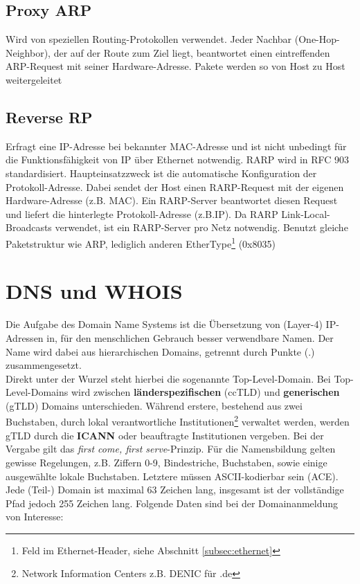 \documentclass{article} %
\begin{document}
\subsection{Proxy ARP}

Wird von speziellen Routing-Protokollen verwendet.
Jeder Nachbar (One-Hop-Neighbor), der auf der Route zum Ziel liegt, beantwortet einen eintreffenden ARP-Request mit seiner Hardware-Adresse.
Pakete werden so von Host zu Host weitergeleitet

\subsection{Reverse RP}

Erfragt eine IP-Adresse bei bekannter MAC-Adresse und ist nicht unbedingt für die Funktionsfähigkeit von IP über Ethernet notwendig.
RARP wird in RFC 903 \cite{rfc903} standardisiert.
Haupteinsatzzweck ist die automatische Konfiguration der Protokoll-Adresse.
Dabei sendet der Host einen RARP-Request mit der eigenen Hardware-Adresse (z.B. MAC).
Ein RARP-Server beantwortet diesen Request und liefert die hinterlegte Protokoll-Adresse (z.B.IP).
Da RARP Link-Local-Broadcasts verwendet, ist ein RARP-Server pro Netz notwendig.
Benutzt gleiche Paketstruktur wie ARP, lediglich anderen EtherType\footnote{Feld im Ethernet-Header, siehe Abschnitt \ref{subsec:ethernet}} (0x8035)

\section{DNS und WHOIS}

Die Aufgabe des Domain Name Systems ist die Übersetzung von (Layer-4) IP-Adressen in, für den menschlichen Gebrauch besser verwendbare Namen.
Der Name wird dabei aus hierarchischen Domains, getrennt durch Punkte (.) zusammengesetzt.\\
Direkt unter der Wurzel steht hierbei die sogenannte Top-Level-Domain.
Bei Top-Level-Domains wird zwischen \textbf{länderspezifischen} (ccTLD) und \textbf{generischen} (gTLD) Domains unterschieden.
Während erstere, bestehend aus zwei Buchstaben, durch lokal verantwortliche Institutionen\footnote{Network Information Centers z.B. DENIC für .de} verwaltet werden, werden gTLD durch die \textbf{ICANN} oder beauftragte Institutionen vergeben.
Bei der Vergabe gilt das \emph{first come, first serve}-Prinzip.
Für die Namensbildung gelten gewisse Regelungen, z.B. Ziffern 0-9, Bindestriche, Buchstaben, sowie einige ausgewählte lokale Buchstaben.
Letztere müssen ASCII-kodierbar sein (ACE)\cite{rfc3490}.
Jede (Teil-) Domain ist maximal 63 Zeichen lang, insgesamt ist der vollständige Pfad jedoch 255 Zeichen lang.
Folgende Daten sind bei der Domainanmeldung von Interesse:
\end{document}
